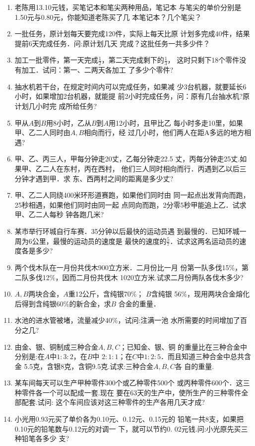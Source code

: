\begin{enumerate}
\item  老陈用13.10元钱，买笔记本和笔尖两种用品，笔记本
与笔尖的单价分别是1.50元与0.80元，你能知道老陈买了几
本笔记本？几个笔尖？
\item  一批任务，原计划每天要完成120件，实际上每天比原
计划多完成40件，结果提前6天完成任务．问:原计划几天
完成？这批任务一共多少件？
\item  加工一批零件，第一天完成$\frac{1}{2}$，第二天完成剩下的$\frac{1}{3}$，
这时只剩下18个零件没有加工．试问：第一、二两天各加工
了多少个零件?
\item  抽水机若干台，在规定时间内可以完成任务，如果减
少3台机器，就要延长6小时，如果增加2台机器，就能提
前2小时完成任务，问：原有几台抽水机?原计划几小时完
成所给任务?
\item  甲从$A$到$B$用8小时，乙从$B$到$A$用12小时，且甲比乙
每小时多走10里，如果甲、乙二人同时由$A, B$相向而行，经
过几小时，他们两人在距A多远的地方相遇?
\item  甲、乙、丙三人，甲每分钟走20丈，乙每分钟走22.5
丈，丙每分钟走25丈.如果甲、乙二人在东村，丙在西村，
他们三人同时相向而行．丙遇到乙以后三分钟才遇到甲．求
东、西两村之间的距离是多少丈?
\item  甲、乙二人同绕400米环形道赛跑，如果他们同时由
同一起点出发背向而跑，25秒相遇，如果他们同时由同一起
点同向而跑，2分零5秒甲能追上乙．试求甲、乙二人每秒
钟各跑几米?
\item  某市举行环城自行车赛．35分钟以后最快的运动员遇
到最慢的．已知环城一周为6公里，最慢的运动员的速度是
最快的速度的$\frac{5}{7}$．试求这两名运动员的速度各是多少?
\item  两个伐木队在一月份共伐木900立方米．二月份比一月
份第一队多伐15\%，第二队多伐12\%，因而二月份共伐木
1020立方米.试求二月份两队各伐木多少?
\item $A, B$两块合金，$A$重12公斤，含纯银70\%； $B$含纯银
56\%，现用两块合金熔化后得到含纯银60\%的新合金，求$B$
合金的重量．
\item 水池的进水管被堵，流量减少40\%，试问:注满一池
水所需要的时间增加了百分之几?
\item 由金、银、铜制成三种合金$A, B,C$；已知金、银、铜
的重量比在三种合金中分别是:在$A$中$1:3:2$，在$B$中
$2:1:1$；在$C$中$1:2:5$．而且知道三种合金中总共含金
5.5克，含银8克，含铜9.5克.试求:三种合金$A, B,C$各
自的重量.
\item 某车间每天可以生产甲种零件300个或乙种零件500个
或丙种零件600个．这三种零件各一个可以配成一套.现在
要在63天的生产中，使所生产的三种零件全部配套.试问:
这个车间应该对这三种零件的生产各用几天才成?
\item 小光用0.93元买了单价各为0.10元、0.12元、0.15元的
铅笔一共8支，如果把0.10元的铅笔数与0.12元的对调一
下，就可以节约0. 02元钱.问:小光原先买三种铅笔各多少
支?


\end{enumerate}
